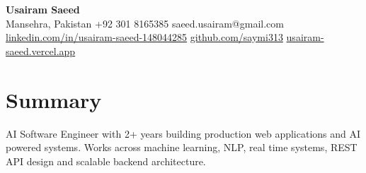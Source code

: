 \documentclass[11pt,letterpaper]{article}
\begin{document}
\begin{center}
  {\fontsize{17}{20}\selectfont\bfseries Usairam Saeed}\\[0.3em]
  {\small Mansehra, Pakistan \textbar{} +92 301 8165385 \textbar{} saeed.usairam@gmail.com \textbar{} \href{https://www.linkedin.com/in/usairam-saeed-148044285/}{linkedin.com/in/usairam-saeed-148044285} \textbar{} \href{https://github.com/saymi313}{github.com/saymi313} \textbar{} \href{https://usairam-saeed.vercel.app/}{usairam-saeed.vercel.app}}
\end{center}


\section{Summary}
AI Software Engineer with 2+ years building production web applications and AI powered systems. Works across machine learning, NLP, real time systems, REST API design and scalable backend architecture.
\end{document}
